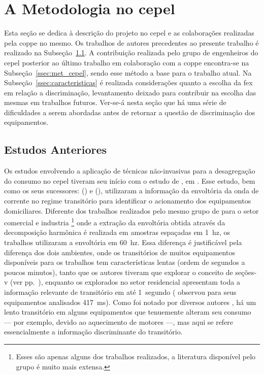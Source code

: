 \section[A Metodologia no CEPEL]{A Metodologia no \acs{cepel}}
\label{sec:nilm_cepel}

Esta seção se dedica à descrição do projeto no \gls{cepel} e as
colaborações realizadas pela \acs{coppe} no mesmo. Os trabalhos de
autores precedentes ao presente trabalho é realizado na
Subseção~\ref{ssec:cepel_anteriores}. A contribuição realizada pelo
grupo de engenheiros do \gls{cepel} posterior ao último trabalho em
colaboração com a \acs{coppe} encontra-se na
Subseção~\ref{ssec:met_cepel}, sendo esse método a base
para o trabalho atual. Na Subseção~\ref{ssec:caracteristicas} é
realizada considerações quanto a escolha da \gls{fex} em relação a
discriminação, levantamento deixado para contribuir na escolha das
mesmas em trabalhos futuros. Ver-se-á nesta seção que há uma série de
dificuldades a serem abordadas antes de retornar a questão de
discriminação dos equipamentos.

\subsection{Estudos Anteriores}
\label{ssec:cepel_anteriores}

Os estudos envolvendo a aplicação de técnicas não-invasivas para a
desagregação do consumo no \gls{cepel} tiveram seu início com o estudo de
\citet*{nilm_cepel_aguiar}, em \citeyear{nilm_cepel_aguiar}. Esse
estudo, bem como os seus sucessores:
\citet{nilm_cepel_bezerra} (\citeyear{nilm_cepel_bezerra}) e
\citet*{nilm_cepel_alvaro} (\citeyear{nilm_cepel_alvaro}), utilizaram a
informação da envoltória da onda de corrente no regime transitório
para identificar o acionamento dos equipamentos domiciliares. Diferente
dos trabalhos realizados pelo mesmo grupo de
\citeauthor*{nilm_hart_1992_8} para o setor comercial e industria
\cite{nilm_norford_leeb_medianfilt_1996_13,
nilm_leeb_spectral_envelope_1995_23}\footnote{Esses são apenas alguns
dos trabalhos realizados, a literatura disponível pelo grupo é muito
mais extensa.} onde a extração da envoltória obtida através da decomposição
harmônica é realizada em amostras espaçadas em 1~\acs{hz}, os
trabalhos utilizaram a envoltória em 60~\acs{hz}. Essa diferença
é justificável pela diferença dos dois ambientes, onde os transitórios
de muitos equipamentos disponíveis para os trabalhos
\cite{nilm_norford_leeb_medianfilt_1996_13,
nilm_leeb_spectral_envelope_1995_23} tem características lentas (ordem
de segundos a poucos minutos), tanto que os autores tiveram que
explorar o conceito de seções-v (ver
pp.~\pageref{nilm:pot_real_trans}), enquanto os explorados no setor
residencial apresentam toda a informação relevante de
transitório em até 1~segundo (\cite{nilm_cepel_aguiar} observou para
seus equipamentos analisados 417~ms). Como foi notado por diversos autores
\cite{nilm_hart_1992_8,nilm_sultanem_1991_10,
nilm_cole_data_extraction_1998_14,nilm_cole_extra_info_surge_1998_15},
há um lento transitório em alguns equipamentos que tenuemente alteram
seu consumo --- por exemplo, devido ao aquecimento de motores ---, mas
aqui se refere essencialmente a informação discriminante do
transitório.

